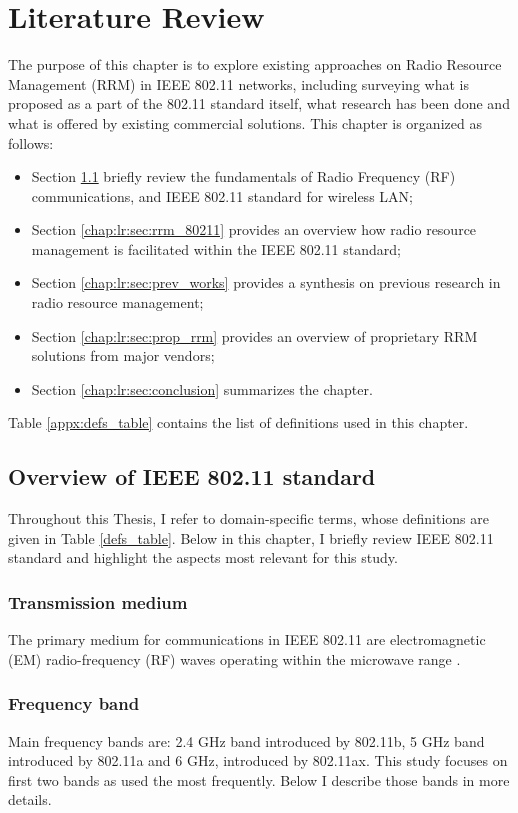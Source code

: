 \chapter{Literature Review}
\label{chap:lr}
\chaptermark{}
The purpose of this chapter is to explore existing approaches on Radio Resource Management (RRM) in IEEE 802.11 networks, including surveying what is proposed as a part of the 802.11 standard itself, what research has been done and what is offered by existing commercial solutions. This chapter is organized as follows:
\begin{itemize}
    \item Section \ref{chap:lr:sec:80211_overview} briefly review the fundamentals of Radio Frequency (RF) communications, and IEEE 802.11 standard for wireless LAN;
    \item Section \ref{chap:lr:sec:rrm_80211} provides an overview how radio resource management is facilitated within the IEEE 802.11 standard;
    \item Section \ref{chap:lr:sec:prev_works} provides a synthesis on previous research in radio resource management;
    \item Section \ref{chap:lr:sec:prop_rrm} provides an overview of proprietary RRM solutions from major vendors;
    \item Section \ref{chap:lr:sec:conclusion} summarizes the chapter.
\end{itemize}
Table \ref{appx:defs_table} contains the list of definitions used in this chapter.

\section{Overview of IEEE 802.11 standard}
\label{chap:lr:sec:80211_overview}

Throughout this Thesis, I refer to domain-specific terms, whose definitions are given in Table \ref{defs_table}. Below in this chapter, I briefly review IEEE 802.11 standard and highlight the aspects most relevant for this study.


\subsection{Transmission medium}

The primary medium for communications in IEEE 802.11 are electromagnetic (EM) radio-frequency (RF) waves operating within the microwave range \cite{colemanCWNACertifiedWireless2021}.

\subsection{Frequency band}
Main frequency bands are: 2.4 GHz band introduced by 802.11b, 5 GHz band introduced by 802.11a and 6 GHz, introduced by 802.11ax. This study focuses on first two bands as used the most frequently. Below I describe those bands in more details.

